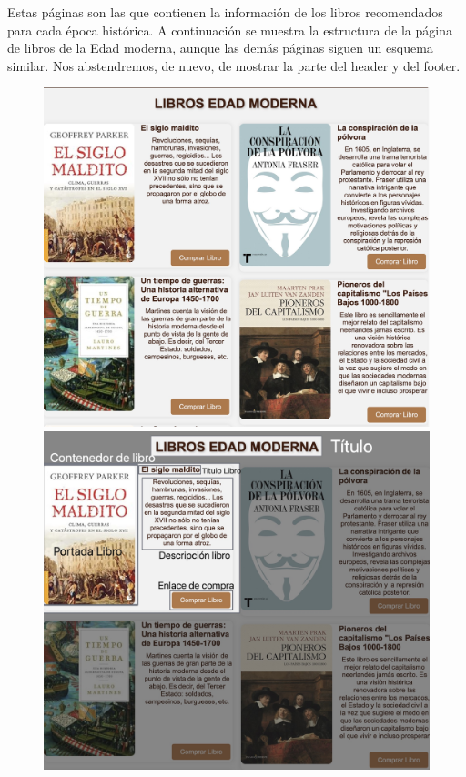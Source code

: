 \documentclass{article}
\begin{document}
Estas páginas son las que contienen la información de los libros recomendados para cada época histórica. A continuación se muestra la estructura de la página de libros de la Edad moderna, aunque las demás páginas siguen un esquema similar. Nos abstendremos, de nuevo, de mostrar la parte del header y del footer.

\begin{figure}[H]
    \centering
    \begin{minipage}{0.49\textwidth}
        \includegraphics[width=\linewidth]{htmlFotos/libros.jpg}
    \end{minipage}\hfill
    \begin{minipage}{0.49\textwidth}
        \includegraphics[width=\linewidth]{htmlFotos/prototipoLibros.jpg}
    \end{minipage}
    

\end{figure}
\end{document}
